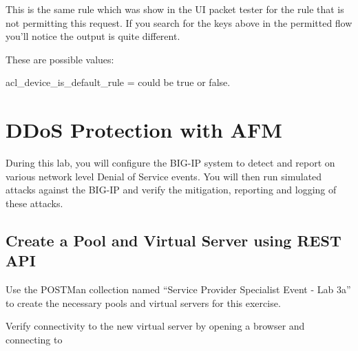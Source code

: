 \documentclass[letterpaper,10pt,english]{sphinxmanual}
\begin{document}
This is the same rule which was show in the UI packet tester for the
rule that is not permitting this request. If you search for the keys
above in the permitted flow you’ll notice the output is quite different.

These are possible values:




acl\_device\_is\_default\_rule = could be true or false.


\section{DDoS Protection with AFM}
\label{\detokenize{class1/module3/module3::doc}}\label{\detokenize{class1/module3/module3:ddos-protection-with-afm}}
During this lab, you will configure the BIG-IP system to detect and
report on various network level Denial of Service events. You will then
run simulated attacks against the BIG-IP and verify the mitigation,
reporting and logging of these attacks.


\subsection{Create a Pool and Virtual Server using REST API}
\label{\detokenize{class1/module3/lab1::doc}}\label{\detokenize{class1/module3/lab1:create-a-pool-and-virtual-server-using-rest-api}}
Use the POSTMan collection named “Service Provider Specialist Event -
Lab 3a” to create the necessary pools and virtual servers for this
exercise.

Verify connectivity to the new virtual server by opening a browser and
connecting to 
\end{document}
